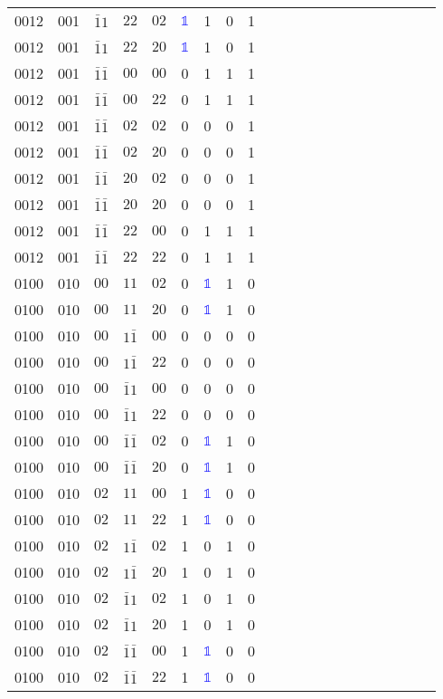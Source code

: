 \begin{longtable*}{c| cccccccccccccccccccc }
0012& 001& $\bar{1}1$& $22$& $02$& \textcolor{blue}{$\mathds{1}$}& 1& 0& 1\\
0012& 001& $\bar{1}1$& $22$& $20$& \textcolor{blue}{$\mathds{1}$}& 1& 0& 1\\
0012& 001& $\bar{1}\bar{1}$& $00$& $00$& 0& 1& 1& 1\\
0012& 001& $\bar{1}\bar{1}$& $00$& $22$& 0& 1& 1& 1\\
0012& 001& $\bar{1}\bar{1}$& $02$& $02$& 0& 0& 0& 1\\
0012& 001& $\bar{1}\bar{1}$& $02$& $20$& 0& 0& 0& 1\\
0012& 001& $\bar{1}\bar{1}$& $20$& $02$& 0& 0& 0& 1\\
0012& 001& $\bar{1}\bar{1}$& $20$& $20$& 0& 0& 0& 1\\
0012& 001& $\bar{1}\bar{1}$& $22$& $00$& 0& 1& 1& 1\\
0012& 001& $\bar{1}\bar{1}$& $22$& $22$& 0& 1& 1& 1\\
0100& 010& $00$& $11$& $02$& 0& \textcolor{blue}{$\mathds{1}$}& 1& 0\\
0100& 010& $00$& $11$& $20$& 0& \textcolor{blue}{$\mathds{1}$}& 1& 0\\
0100& 010& $00$& $1\bar{1}$& $00$& 0& 0& 0& 0\\
0100& 010& $00$& $1\bar{1}$& $22$& 0& 0& 0& 0\\
0100& 010& $00$& $\bar{1}1$& $00$& 0& 0& 0& 0\\
0100& 010& $00$& $\bar{1}1$& $22$& 0& 0& 0& 0\\
0100& 010& $00$& $\bar{1}\bar{1}$& $02$& 0& \textcolor{blue}{$\mathds{1}$}& 1& 0\\
0100& 010& $00$& $\bar{1}\bar{1}$& $20$& 0& \textcolor{blue}{$\mathds{1}$}& 1& 0\\
0100& 010& $02$& $11$& $00$& 1& \textcolor{blue}{$\mathds{1}$}& 0& 0\\
0100& 010& $02$& $11$& $22$& 1& \textcolor{blue}{$\mathds{1}$}& 0& 0\\
0100& 010& $02$& $1\bar{1}$& $02$& 1& 0& 1& 0\\
0100& 010& $02$& $1\bar{1}$& $20$& 1& 0& 1& 0\\
0100& 010& $02$& $\bar{1}1$& $02$& 1& 0& 1& 0\\
0100& 010& $02$& $\bar{1}1$& $20$& 1& 0& 1& 0\\
0100& 010& $02$& $\bar{1}\bar{1}$& $00$& 1& \textcolor{blue}{$\mathds{1}$}& 0& 0\\
0100& 010& $02$& $\bar{1}\bar{1}$& $22$& 1& \textcolor{blue}{$\mathds{1}$}& 0& 0\\

\end{longtable*}
